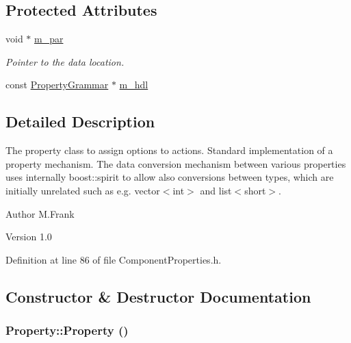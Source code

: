 \subsection*{Protected Attributes}
\begin{DoxyCompactItemize}
\item 
void $\ast$ \hyperlink{class_d_d4hep_1_1_property_a501e760077fb803d75419100c77d3ec4}{m\_\-par}
\begin{DoxyCompactList}\small\item\em Pointer to the data location. \item\end{DoxyCompactList}\item 
const \hyperlink{class_d_d4hep_1_1_property_grammar}{PropertyGrammar} $\ast$ \hyperlink{class_d_d4hep_1_1_property_acae0b73848d2a5c87ff18ef6b564b123}{m\_\-hdl}
\end{DoxyCompactItemize}


\subsection{Detailed Description}
The property class to assign options to actions. Standard implementation of a property mechanism. The data conversion mechanism between various properties uses internally boost::spirit to allow also conversions between types, which are initially unrelated such as e.g. vector$<$int$>$ and list$<$short$>$.

\begin{DoxyAuthor}{Author}
M.Frank 
\end{DoxyAuthor}
\begin{DoxyVersion}{Version}
1.0 
\end{DoxyVersion}


Definition at line 86 of file ComponentProperties.h.

\subsection{Constructor \& Destructor Documentation}
\hypertarget{class_d_d4hep_1_1_property_ab029377b86e5b8ae7513bf93f9c9a955}{
\subsubsection[{Property}]{\setlength{\rightskip}{0pt plus 5cm}Property::Property ()}}
\label{class_d_d4hep_1_1_property_ab029377b86e5b8ae7513bf93f9c9a955}


